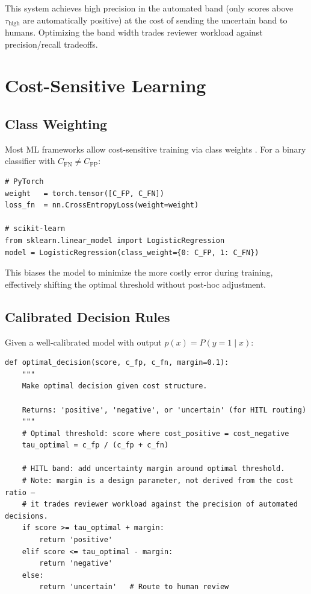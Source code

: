 This system achieves high precision in the automated band (only scores above $\tau_{\mathrm{high}}$ are automatically positive) at the cost of sending the uncertain band to humans. Optimizing the band width trades reviewer workload against precision/recall tradeoffs.

\section{Cost-Sensitive Learning}

\subsection{Class Weighting}

Most ML frameworks allow cost-sensitive training via class weights \autocite{elkan2001cost}. For a binary classifier with $C_{\mathrm{FN}} \neq C_{\mathrm{FP}}$:

\begin{lstlisting}[style=python, caption={Cost-sensitive training in PyTorch and scikit-learn}]
# PyTorch
weight   = torch.tensor([C_FP, C_FN])
loss_fn  = nn.CrossEntropyLoss(weight=weight)

# scikit-learn
from sklearn.linear_model import LogisticRegression
model = LogisticRegression(class_weight={0: C_FP, 1: C_FN})
\end{lstlisting}

This biases the model to minimize the more costly error during training, effectively shifting the optimal threshold without post-hoc adjustment.

\subsection{Calibrated Decision Rules}

Given a well-calibrated model with output $p(x) = P(y=1 \mid x)$:

\begin{lstlisting}[style=python, caption={Optimal decision rule with HITL routing band}]
def optimal_decision(score, c_fp, c_fn, margin=0.1):
    """
    Make optimal decision given cost structure.

    Returns: 'positive', 'negative', or 'uncertain' (for HITL routing)
    """
    # Optimal threshold: score where cost_positive = cost_negative
    tau_optimal = c_fp / (c_fp + c_fn)

    # HITL band: add uncertainty margin around optimal threshold.
    # Note: margin is a design parameter, not derived from the cost ratio —
    # it trades reviewer workload against the precision of automated decisions.
    if score >= tau_optimal + margin:
        return 'positive'
    elif score <= tau_optimal - margin:
        return 'negative'
    else:
        return 'uncertain'   # Route to human review
\end{lstlisting}

